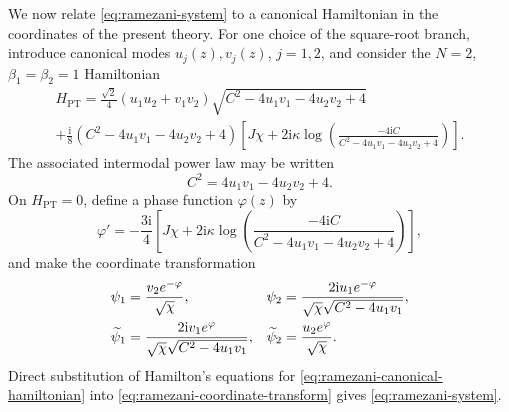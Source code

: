 \documentclass[11pt,a4paper]{article}
\numberwithin{equation}{section}
\begin{document}
We now relate \eqref{eq:ramezani-system} to a canonical Hamiltonian in the coordinates of the present theory. For one choice of the square-root branch, introduce canonical modes $u_j(z),v_j(z)$, $j=1,2$, and consider the $N=2$, $\beta_1=\beta_2=1$ Hamiltonian
\begin{multline}
    H_{\mathrm{PT}}
    =
    \frac{\sqrt{2}}{4}
    (u_1u_2+v_1v_2)
    \sqrt{C^2-4u_1v_1-4u_2v_2+4}
    \\
    +
    \frac{\mathrm{i}}{8}
    (C^2-4u_1v_1-4u_2v_2+4)
    \left[
        J\chi+2\mathrm{i}\kappa
        \log\left(
            \frac{-4\mathrm{i}C}
            {C^2-4u_1v_1-4u_2v_2+4}
        \right)
    \right]. \label{eq:ramezani-canonical-hamiltonian}
\end{multline}
The associated intermodal power law may be written
\begin{equation}
    C^2=4u_1v_1-4u_2v_2+4.
\end{equation}
On $H_{\mathrm{PT}}=0$, define a phase function $\varphi(z)$ by
\begin{equation}
    \varphi'
    =
    -\frac{3\mathrm{i}}{4}
    \left[
        J\chi+2\mathrm{i}\kappa
        \log\left(
            \frac{-4\mathrm{i}C}
            {C^2-4u_1v_1-4u_2v_2+4}
        \right)
    \right],
\end{equation}
and make the coordinate transformation
\begin{align}
    \psi_1
    &=
    \frac{v_2e^{-\varphi}}{\sqrt{\chi}},
    &
    \psi_2
    &=
    \frac{2\mathrm{i}u_1e^{-\varphi}}
    {\sqrt{\chi}\sqrt{C^2-4u_1v_1}},
    \notag \\
    \widetilde{\psi}_1
    &=
    \frac{2\mathrm{i}v_1e^{\varphi}}
    {\sqrt{\chi}\sqrt{C^2-4u_1v_1}},
    &
    \widetilde{\psi}_2
    &=
    \frac{u_2e^{\varphi}}{\sqrt{\chi}}. \label{eq:ramezani-coordinate-transform}
\end{align}
Direct substitution of Hamilton's equations for \eqref{eq:ramezani-canonical-hamiltonian} into \eqref{eq:ramezani-coordinate-transform} gives \eqref{eq:ramezani-system}.
\end{document}
